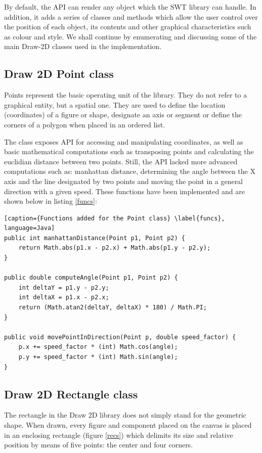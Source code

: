 By default, the API can render any object which the SWT library can handle. In addition, it adds a series of 
classes and methods which allow the user control over the position of each object, its contents and other 
graphical characteristics such as colour and style. We shall continue by enumerating and discussing some of 
the main Draw-2D classes used in the implementation.

\subsection{Draw 2D Point class}

Points represent the basic operating unit of the library. They do not refer to a graphical entity, but a 
spatial one. They are used to define the location (coordinates) of a figure or shape, designate an axis 
or segment or define the corners of a polygon when placed in an ordered list.

The class exposes API for accessing and manipulating coordinates, as well as basic mathematical computations 
such as transposing points and calculating the euclidian distance between two points. Still, the API lacked more 
advanced computations such as: manhattan distance, determining the angle between the X axis and the line 
designated by two points and moving the point in a general direction with a given speed. These functions 
have been implemented and are shown below in listing \ref{funcs}:

\begin{lstlisting}[caption={Functions added for the Point class} \label{funcs}, language=Java]
public int manhattanDistance(Point p1, Point p2) {
	return Math.abs(p1.x - p2.x) + Math.abs(p1.y - p2.y);
} 

public double computeAngle(Point p1, Point p2) {
	int deltaY = p1.y - p2.y;
	int deltaX = p1.x - p2.x;
	return (Math.atan2(deltaY, deltaX) * 180) / Math.PI;
}

public void movePointInDirection(Point p, double speed_factor) {
	p.x += speed_factor * (int) Math.cos(angle);
	p.y += speed_factor * (int) Math.sin(angle);
}

\end{lstlisting}

\subsection{Draw 2D Rectangle class}

The rectangle in the Draw 2D library does not simply stand for the geometric shape. When drawn, every 
figure and component placed on the canvas is placed in an enclosing rectangle (figure \ref{recs}) which delimits its size 
and relative position by means of five points: the center and four corners. 

